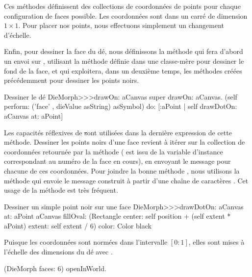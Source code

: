 \documentclass[a4paper,10pt,twoside]{book}
\begin{document}
Ces méthodes définissent des collections de coordonnées de
points pour chaque configuration de faces possible. Les coordonnées
sont dans un carré de dimension $1\times1$. Pour placer nos points,
nous effectuons simplement un changement d'échelle.

Enfin, pour dessiner la face du dé, nous définissons la méthode
 qui fera d'abord un envoi sur , utilisant la méthode
définie dans une classe-mère pour dessiner le fond de la face, et
qui exploitera, dans un deuxième temps, les méthodes créées
précédemment pour dessiner les points noirs.

\begin{method}{Dessiner le dé}
DieMorph>>>drawOn: aCanvas
	super drawOn: aCanvas.
	(self perform: ('face' , dieValue asString) asSymbol)
		do: [:aPoint | self drawDotOn: aCanvas at: aPoint]
\end{method}

Les capacités réflexives de \st sont utilisées dans la
dernière expression de cette méthode. Dessiner les points noirs
d'une face revient à itérer sur la collection 
de coordonnées retournée par la méthode  
( est issu de la variable d'instance 
correspondant au numéro de la face en cours),
en envoyant le message  pour chacune de ces
coordonnées. Pour joindre la bonne méthode %
, nous utilisons la méthode  qui
envoie le message construit à partir d'une chaîne de
caractères .
Cet usage de la méthode  est très fréquent.
\begin{method}{Dessiner un simple point noir sur une face}
DieMorph>>>drawDotOn: aCanvas at: aPoint
	aCanvas
		fillOval: (Rectangle
			center: self position + (self extent * aPoint)
			extent: self extent / 6)
		color: Color black
\end{method}

Puisque les coordonnées sont normées dans l'intervalle $[0{:}1]$,
elles sont mises à l'échelle des dimensions du dé avec 
.

\begin{code}{}
(DieMorph faces: 6) openInWorld.
\end{code}
\end{document}
